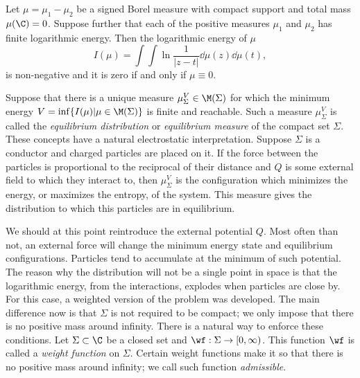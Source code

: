 \begin{lema} 	\label{Lema: positive kernel}
	\cite{saff2024logarithmic}
	Let $\mu = \mu_1 - \mu_2$ be a signed Borel measure with compact support	and total mass $\mu(\C) = 0$. Suppose further that each of the positive measures $\mu_1$ and $\mu_2$ has finite logarithmic energy. Then the logarithmic energy of $\mu$
	\begin{equation}
		I(\mu) = \int \int \ln \frac{1}{|z-t|} \dd \mu(z) \dd \mu (t),
	\end{equation}
	is non-negative and it is zero if and only if $\mu \equiv 0$.
\end{lema}

Suppose that there is a unique measure $ \mu^V_\Sigma \in \M(\Sigma)$ for which the minimum energy $V = \inf\{ I(\mu) | \mu \in \M(\Sigma)\}$ is finite and reachable. Such a measure $\mu^V_\Sigma$ is called the \textit{equilibrium distribution} or \textit{equilibrium measure} of the compact set $\Sigma$. These concepts have a natural electrostatic interpretation. Suppose $\Sigma$ is a conductor and charged particles are placed on it. If the force between the particles is proportional to the reciprocal of their distance and $Q$ is some external field to which they interact to, then $\mu^V_\Sigma$ is the configuration which minimizes the energy, or maximizes the entropy, of the system. This measure gives the distribution to which this particles are in equilibrium. 

We should at this point reintroduce the external potential $Q$. Most often than not, an external force will change the minimum energy state and equilibrium configurations. Particles tend to accumulate at the minimum of such potential. The reason why the distribution will not be a single point in space is that the logarithmic energy, from the interactions, explodes when particles are close by. For this case, a weighted version of the problem was developed. The main difference now is that $\Sigma$ is not required to be compact; we only impose that there is no positive mass around infinity. There is a natural way to enforce these conditions. Let $\Sigma \subset \C$ be a closed set and $\wf : \Sigma \rightarrow [0, \infty)$. This function $\wf$ is called a \textit{weight function} on $\Sigma$. Certain weight functions make it so that there is no positive mass around infinity; we call such function \textit{admissible}.

